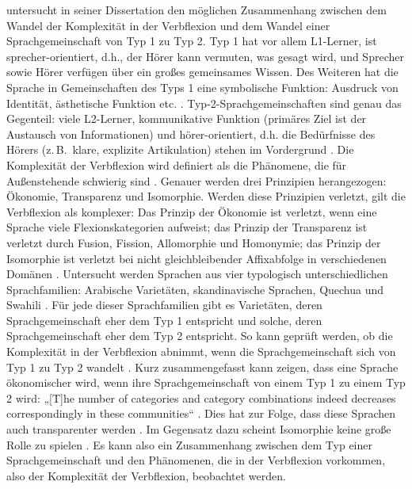 \citet{Kusters2003} untersucht in seiner Dissertation den möglichen Zusammenhang zwischen dem Wandel der Komplexität in der Verbflexion und dem Wandel einer Sprachgemeinschaft von Typ 1 zu Typ 2. Typ 1 hat vor allem L1-Ler\-ner, ist sprecher-orientiert, d.h., der Hörer kann vermuten, was gesagt wird, und Sprecher sowie Hörer verfügen über ein großes gemeinsames Wissen. Des Weiteren hat die Sprache in Gemeinschaften des Typs 1 eine symbolische Funktion: Ausdruck von Identität, ästhetische Funktion etc. \citep[41]{Kusters2003}. Typ-2-Sprachgemeinschaften sind genau das Gegenteil: viele L2-Ler\-ner, kommunikative Funktion (primäres Ziel ist der Austausch von Informationen) und hörer-orientiert, d.h. die Bedürfnisse des Hörers (z.\,B.\ klare, explizite Artikulation) stehen im Vordergrund \citep[41]{Kusters2003}. Die Komplexität der Verbflexion wird definiert als die Phänomene, die für Außenstehende schwierig sind \citep[403]{Kusters2003}. Genauer werden drei Prinzipien herangezogen: Ökonomie, Transparenz und Isomorphie. Werden diese Prinzipien verletzt, gilt die Verbflexion als komplexer: Das Prinzip der Ökonomie ist verletzt, wenn eine Sprache viele Flexionskategorien aufweist; das Prinzip der Transparenz ist verletzt durch Fusion, Fission, Allomorphie und Homonymie; das Prinzip der Isomorphie ist verletzt bei nicht gleichbleibender Affixabfolge in verschiedenen Domänen \citep[403]{Kusters2003}. Untersucht werden Sprachen aus vier typologisch unterschiedlichen Sprachfamilien: Arabische Varietäten, skandinavische Sprachen, Quechua und Swahili \citep[403]{Kusters2003}. Für jede dieser Sprachfamilien gibt es Varietäten, deren Sprachgemeinschaft eher dem Typ 1 entspricht und solche, deren Sprachgemeinschaft eher dem Typ 2 entspricht. So kann geprüft werden, ob die Komplexität in der Verbflexion abnimmt, wenn die Sprachgemeinschaft sich von Typ 1 zu Typ 2 wandelt \citep[45]{Kusters2003}. Kurz zusammengefasst kann \citet{Kusters2003} zeigen, dass eine Sprache ökonomischer wird, wenn ihre Sprachgemeinschaft von einem Typ 1 zu einem Typ 2 wird: „[T]he number of categories and category combinations indeed decreases correspondingly in these communities“ \citep[357]{Kusters2003}. Dies hat zur Folge, dass diese Sprachen auch transparenter werden \citep[357]{Kusters2003}. Im Gegensatz dazu scheint Isomorphie keine große Rolle zu spielen \citep[357]{Kusters2003}. Es kann also ein Zusammenhang zwischen dem Typ einer Sprachgemeinschaft und den Phänomenen, die in der Verbflexion vorkommen, also der Komplexität der Verbflexion, beobachtet werden.

